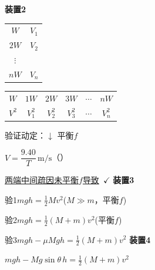 \textbf{装置2}


\begin{tabular}{@{}c@{\qquad}c@{}}
$W$ & $V_1$ \\
$2W$ & $V_2$ \\
$\vdots$ & \\
$nW$ & $V_n$
\end{tabular}

\begin{center}
\begin{tabular}{|c|c|c|c|c|c|}
\hline
$W$ & $1W$ & $2W$ & $3W$ & $\cdots$ & $nW$ \\
$V^2$ & $V_1^2$ & $V_2^2$ & $V_3^2$ & $\cdots$ & $V_n^2$ \\
\hline
\end{tabular}
\end{center}

验证动定：$\downarrow$ 平衡$f$




$V=\dfrac{9.40}{T}\,\mathrm{m/s}$（）\quad {}\quad {}\quad {}

\underline{两端中间疏因未平衡$f$导致}\ $\checkmark$
\textbf{装置3}


验1\quad $mgh=\frac{1}{2}Mv^2$\quad ($M\gg m$，平衡$f$)

验2\quad $mgh=\frac{1}{2}(M+m)v^2$\quad (平衡$f$)

验3\quad $mgh-\mu Mgh=\frac{1}{2}(M+m)v^2$
\textbf{装置4}


$mgh-Mg\sin\theta\,h=\frac{1}{2}(M+m)v^2$
